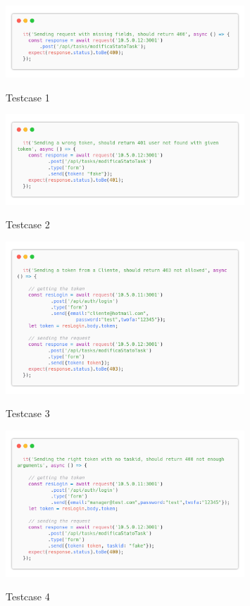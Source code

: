 \documentclass{report}
\begin{document}
\begin{figure}[H]
	\centering\includegraphics[width=0.8\textwidth]{images/code_modifica_stato_test1.png}
	
	Testcase 1
\end{figure}
\begin{figure}[H]
	\centering\includegraphics[width=0.8\textwidth]{images/code_modifica_stato_test2.png}
	
	Testcase 2
\end{figure}
\begin{figure}[H]
	\centering\includegraphics[width=0.8\textwidth]{images/code_modifica_stato_test3.png}
	
	Testcase 3
\end{figure}
\begin{figure}[H]
	\centering\includegraphics[width=0.8\textwidth]{images/code_modifica_stato_test4.png}
	
	Testcase 4
\end{figure}
\end{document}
